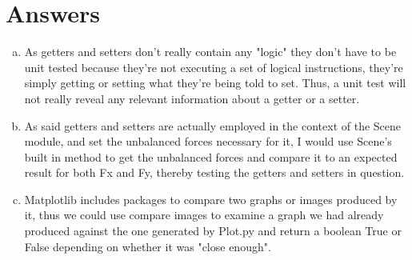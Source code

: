 \documentclass[12pt]{article}
\begin{document}
\section{Answers}
\begin{enumerate}[a)]
\item As getters and setters don't really contain any "logic" they don't have to be unit tested because they're not executing a set of logical instructions, they're simply getting or setting what they're being told to set. Thus, a unit test will not really reveal any relevant information about a getter or a setter.
\item As said getters and setters are actually employed in the context of the Scene module, and set the unbalanced forces necessary for it, I would use Scene's built in method to get the unbalanced forces and compare it to an expected result for both Fx and Fy, thereby testing the getters and setters in question.
\item Matplotlib includes packages to compare two graphs or images produced by it, thus we could use compare images to examine a graph we had already produced against the one generated by Plot.py and return a boolean True or False depending on whether it was "close enough".
        

\end{enumerate}
\end{document}
